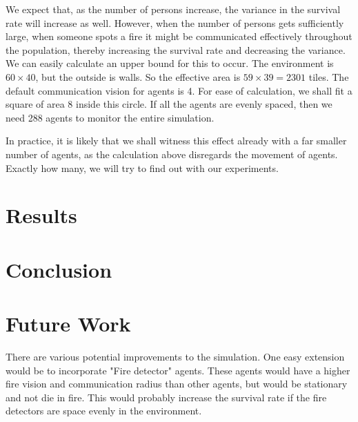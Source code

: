\documentclass[a4paper]{article}
\begin{document}
We expect that, as the number of persons increase, the variance in the survival rate will increase as well. However, when the number of persons gets sufficiently large, when someone spots a fire it might be communicated effectively throughout the population, thereby increasing the survival rate and decreasing the variance. We can easily calculate an upper bound for this to occur. The environment is \(60\times 40\), but the outside is walls. So the effective area is \(59 \times 39 = 2301\) tiles. The default communication vision for agents is 4. For ease of calculation, we shall fit a square of area 8 inside this circle. If all the agents are evenly spaced, then we need 288 agents to monitor the entire simulation.

In practice, it is likely that we shall witness this effect already with a far smaller number of agents, as the calculation above disregards the movement of agents. Exactly how many, we will try to find out with our experiments.


\section{Results}

\section{Conclusion}

\section{Future Work}
There are various potential improvements to the simulation. One easy extension would be to incorporate "Fire detector" agents. These agents would have a higher fire vision and communication radius than other agents, but would be stationary and not die in fire. This would probably increase the survival rate if the fire detectors are space evenly in the environment.
\end{document}
